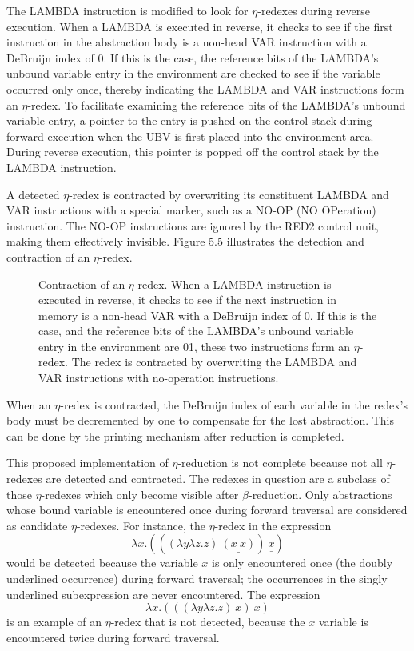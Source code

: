 The LAMBDA instruction is modified to look for \(\eta\)-redexes during reverse
execution. When a LAMBDA is executed in reverse, it checks to see if the first
instruction in the abstraction body is a non-head VAR instruction with a
DeBruijn index of 0. If this is the case, the reference bits of the LAMBDA's
unbound variable entry in the environment are checked to see if the variable
occurred only once, thereby indicating the LAMBDA and VAR instructions form an
\(\eta\)-redex. To facilitate examining the reference bits of the LAMBDA's
unbound variable entry, a pointer to the entry is pushed on the control stack
during forward execution when the UBV is first placed into the environment
area. During reverse execution, this pointer is popped off the control stack by
the LAMBDA instruction.

A detected \(\eta\)-redex is contracted by overwriting its constituent LAMBDA
and VAR instructions with a special marker, such as a NO-OP (NO OPeration)
instruction. The NO-OP instructions are ignored by the RED2 control unit, making
them effectively invisible. Figure 5.5 illustrates the detection and contraction
of an \(\eta\)-redex.

\begin{figure}[htbp]
\centering

\caption[Contraction of an \(\eta\)-redex]{Contraction of an \(\eta\)-redex. When a LAMBDA instruction is
executed in reverse, it checks to see if the next instruction in memory is a
non-head VAR with a DeBruijn index of 0. If this is the case, and the reference
bits of the LAMBDA's unbound variable entry in the environment are 01, these two
instructions form an \(\eta\)-redex. The redex is contracted by overwriting the
LAMBDA and VAR instructions with no-operation instructions.}
\end{figure}

When an \(\eta\)-redex is contracted, the DeBruijn index of each variable in the
redex's body must be decremented by one to compensate for the lost abstraction.
This can be done by the printing mechanism after reduction is completed.

This proposed implementation of \(\eta\)-reduction is not complete because not
all \(\eta\)-redexes are detected and contracted. The redexes in question are a
subclass of those \(\eta\)-redexes which only become visible after
\(\beta\)-reduction. Only abstractions whose bound variable is encountered once
during forward traversal are considered as candidate \(\eta\)-redexes. For
instance, the \(\eta\)-redex in the expression
\[
\lambda x.(((\lambda y\lambda z.z)\ \underline{(x\ x)})\ \underline{\underline{x}})
\]
would be detected because the variable \(x\) is only encountered once (the
doubly underlined occurrence) during forward traversal; the occurrences in the
singly underlined subexpression are never encountered.
The expression
\[
\lambda x.(((\lambda y\lambda z.z)\ x)\ x)
\]
is an example of an \(\eta\)-redex that is not detected, because the \(x\)
variable is encountered twice during forward traversal.

